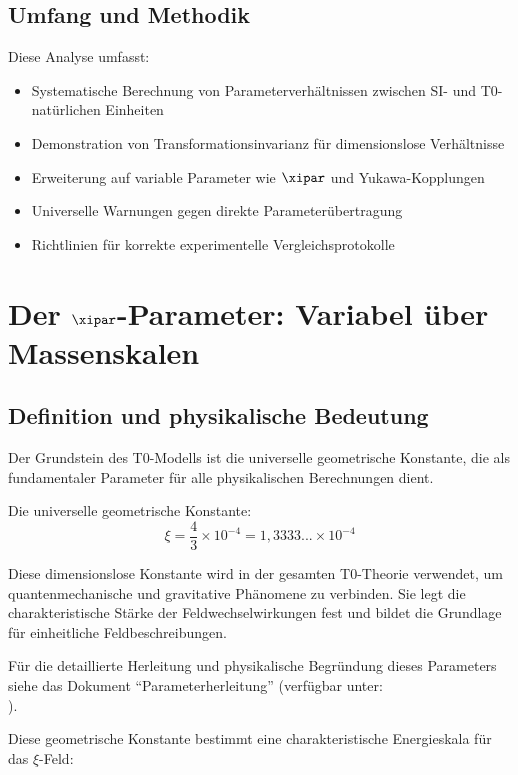 	\subsection{Umfang und Methodik}
	\label{subsec:umfang}
	
	Diese Analyse umfasst:
	\begin{itemize}
		\item Systematische Berechnung von Parameterverhältnissen zwischen SI- und T0-natürlichen Einheiten
		\item Demonstration von Transformationsinvarianz für dimensionslose Verhältnisse
		\item Erweiterung auf variable Parameter wie $\xipar$ und Yukawa-Kopplungen
		\item Universelle Warnungen gegen direkte Parameterübertragung
		\item Richtlinien für korrekte experimentelle Vergleichsprotokolle
	\end{itemize}
	
	\section{Der $\xipar$-Parameter: Variabel über Massenskalen}
	\label{sec:xi_parameter}
	
	\subsection{Definition und physikalische Bedeutung}

	Der Grundstein des T0-Modells ist die universelle geometrische Konstante, die als fundamentaler Parameter für alle physikalischen Berechnungen dient.

		Die universelle geometrische Konstante:
		\begin{equation}
			\xi = \frac{4}{3} \times 10^{-4} = 1,3333... \times 10^{-4}
		\end{equation}

	Diese dimensionslose Konstante wird in der gesamten T0-Theorie verwendet, um quantenmechanische und gravitative Phänomene zu verbinden. Sie legt die charakteristische Stärke der Feldwechselwirkungen fest und bildet die Grundlage für einheitliche Feldbeschreibungen.

		Für die detaillierte Herleitung und physikalische Begründung dieses Parameters siehe das Dokument ``Parameterherleitung'' (verfügbar unter:\\ ).

	Diese geometrische Konstante bestimmt eine charakteristische Energieskala für das $\xi$-Feld:
	
